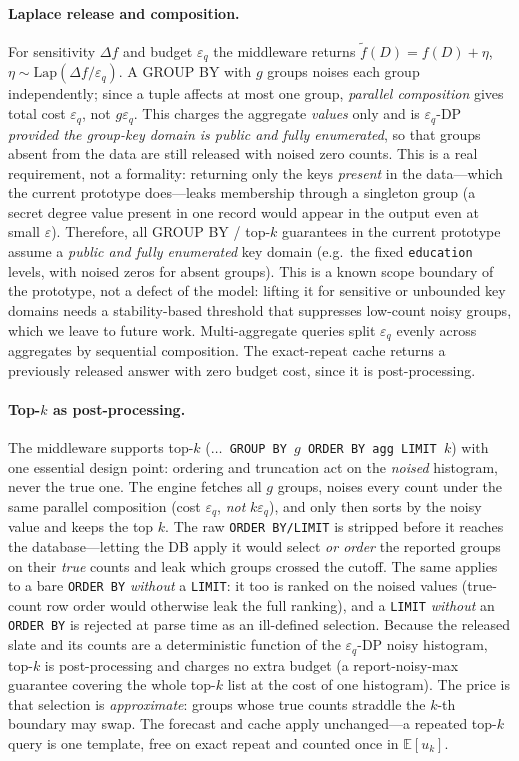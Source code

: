 \documentclass[sigconf,nonacm]{acmart}
\newcommand{\eps}{\varepsilon}
\newcommand{\E}{\mathbb{E}}
\newcommand{\Lap}{\mathrm{Lap}}
\begin{document}
\paragraph{Laplace release and composition.}
For sensitivity $\Delta f$ and budget $\eps_q$ the middleware returns $\tilde f(D)=f(D)+\eta$, $\eta\sim\Lap(\Delta f/\eps_q)$. A GROUP BY with $g$ groups noises each group independently; since a tuple affects at most one group, \emph{parallel composition} gives total cost $\eps_q$, not $g\eps_q$. This charges the aggregate \emph{values} only and is $\eps_q$-DP \emph{provided the group-key domain is public and fully enumerated}, so that groups absent from the data are still released with noised zero counts. This is a real requirement, not a formality: returning only the keys \emph{present} in the data---which the current prototype does---leaks membership through a singleton group (a secret degree value present in one record would appear in the output even at small $\eps$). Therefore, all GROUP BY / top-$k$ guarantees in the current prototype assume a \emph{public and fully enumerated} key domain (e.g.\ the fixed \texttt{education} levels, with noised zeros for absent groups). This is a known scope boundary of the prototype, not a defect of the model: lifting it for sensitive or unbounded key domains needs a stability-based threshold that suppresses low-count noisy groups, which we leave to future work. Multi-aggregate queries split $\eps_q$ evenly across aggregates by sequential composition. The exact-repeat cache returns a previously released answer with zero budget cost, since it is post-processing.

\paragraph{Top-$k$ as post-processing.}
The middleware supports top-$k$ (\texttt{$\ldots$ GROUP BY $g$ ORDER BY agg LIMIT $k$}) with one essential design point: ordering and truncation act on the \emph{noised} histogram, never the true one. The engine fetches all $g$ groups, noises every count under the same parallel composition (cost $\eps_q$, \emph{not} $k\eps_q$), and only then sorts by the noisy value and keeps the top $k$. The raw \texttt{ORDER BY/LIMIT} is stripped before it reaches the database---letting the DB apply it would select \emph{or order} the reported groups on their \emph{true} counts and leak which groups crossed the cutoff. The same applies to a bare \texttt{ORDER BY} \emph{without} a \texttt{LIMIT}: it too is ranked on the noised values (true-count row order would otherwise leak the full ranking), and a \texttt{LIMIT} \emph{without} an \texttt{ORDER BY} is rejected at parse time as an ill-defined selection. Because the released slate and its counts are a deterministic function of the $\eps_q$-DP noisy histogram, top-$k$ is post-processing and charges no extra budget (a report-noisy-max guarantee covering the whole top-$k$ list at the cost of one histogram). The price is that selection is \emph{approximate}: groups whose true counts straddle the $k$-th boundary may swap. The forecast and cache apply unchanged---a repeated top-$k$ query is one template, free on exact repeat and counted once in $\E[u_k]$.
\end{document}
